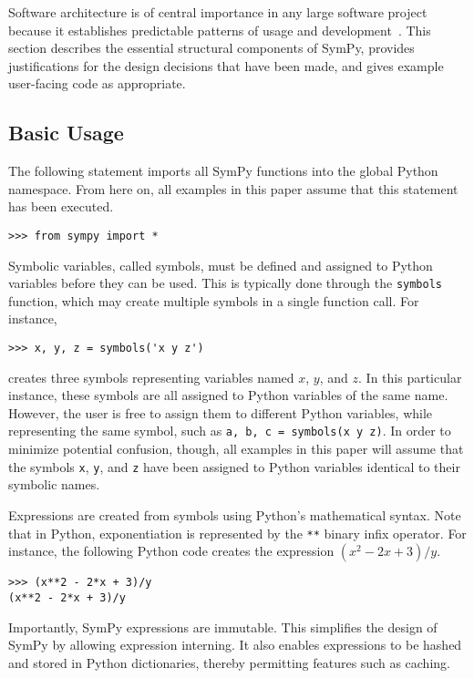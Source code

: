 Software architecture is of central importance in any large software
project because it establishes predictable patterns of usage and
development~\cite{Shaw1996}. This section describes the essential
structural components of SymPy, provides justifications for the design
decisions that have been made, and gives example
user-facing code as appropriate.

\subsection{Basic Usage}


The following statement
imports all SymPy functions into the global Python namespace.
From here on, all examples in this paper assume that this statement has been
executed.

\begin{verbatim}
>>> from sympy import *
\end{verbatim}

Symbolic variables, called symbols, must be defined and assigned to
Python variables before they can be used. This is typically done through the
\texttt{symbols} function, which may create multiple symbols in a single
function call. For instance,
\begin{verbatim}
>>> x, y, z = symbols('x y z')
\end{verbatim}
creates three symbols representing variables named $x$, $y$, and $z$. In this
particular instance, these symbols are all assigned to Python variables of the
same name. However, the user is free to assign them to different
Python variables, while representing the same symbol, such as
\texttt{a, b, c = symbols(\textquotesingle{}x y z\textquotesingle{})}.
In order to minimize potential confusion, though, all examples in this paper will
assume that
the symbols \verb|x|, \verb|y|, and \verb|z| have been assigned to Python variables
identical to their symbolic names.

Expressions are created from symbols using Python's mathematical syntax. Note
that in Python, exponentiation is represented by the \verb|**|
binary infix operator. For instance, the
following Python code creates the expression $(x^2 - 2x + 3)/y$.

\begin{verbatim}
>>> (x**2 - 2*x + 3)/y
(x**2 - 2*x + 3)/y
\end{verbatim}

Importantly, SymPy expressions are immutable. This simplifies the design of
SymPy by allowing expression interning. It also enables expressions to be
hashed and stored in Python dictionaries, thereby permitting features
such as caching.

